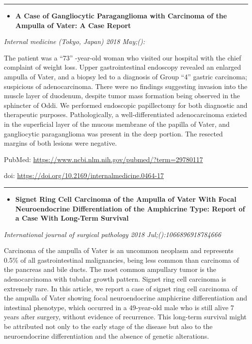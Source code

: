 \documentclass[]{article}
\providecommand{\tightlist}{%
  \setlength{\itemsep}{0pt}\setlength{\parskip}{0pt}}
\begin{document}
{}

\begin{center}\rule{0.5\linewidth}{\linethickness}\end{center}

\begin{itemize}
\tightlist
\item
  \textbf{A Case of Gangliocytic Paraganglioma with Carcinoma of the
  Ampulla of Vater: A Case Report}
\end{itemize}

\emph{Internal medicine (Tokyo, Japan) 2018 May;():}

The patient was a ``73'' -year-old woman who visited our hospital with
the chief complaint of weight loss. Upper gastrointestinal endoscopy
revealed an enlarged ampulla of Vater, and a biopsy led to a diagnosis
of Group ``4'' gastric carcinoma; suspicious of adenocarcinoma. There
were no findings suggesting invasion into the muscle layer of duodenum,
despite tumor mass formation being observed in the sphincter of Oddi. We
performed endoscopic papillectomy for both diagnostic and therapeutic
purposes. Pathologically, a well-differentiated adenocarcinoma existed
in the superficial layer of the mucous membrane of the papilla of Vater,
and gangliocytic paraganglioma was present in the deep portion. The
resected margins of both lesions were negative.

PubMed: \url{https://www.ncbi.nlm.nih.gov/pubmed/?term=29780117}

doi: \url{https://doi.org/10.2169/internalmedicine.0464-17}

{}

{}

\begin{center}\rule{0.5\linewidth}{\linethickness}\end{center}

\begin{itemize}
\tightlist
\item
  \textbf{Signet Ring Cell Carcinoma of the Ampulla of Vater With Focal
  Neuroendocrine Differentiation of the Amphicrine Type: Report of a
  Case With Long-Term Survival}
\end{itemize}

\emph{International journal of surgical pathology 2018
Jul;():1066896918784666}

Carcinoma of the ampulla of Vater is an uncommon neoplasm and represents
0.5\% of all gastrointestinal malignancies, being less common than
carcinoma of the pancreas and bile ducts. The most common ampullary
tumor is the adenocarcinoma with tubular growth pattern. Signet ring
cell carcinoma is extremely rare. In this article, we report a case of
signet ring cell carcinoma of the ampulla of Vater showing focal
neuroendocrine amphicrine differentiation and intestinal phenotype,
which occurred in a 49-year-old male who is still alive 7 years after
surgery, without evidence of recurrence. This long-term survival might
be attributed not only to the early stage of the disease but also to the
neuroendocrine differentiation and the absence of genetic alterations.
\end{document}
